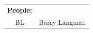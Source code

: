 \documentclass[10pt]{article}
\begin{document}
\begin{center}
\vspace{1em}
\begin{tabular}{|c|c|}\hline %
{\bf People: } & \\
BL & Barry Langman \\
     \hline
\end{tabular}
\end{center}
\end{document}
